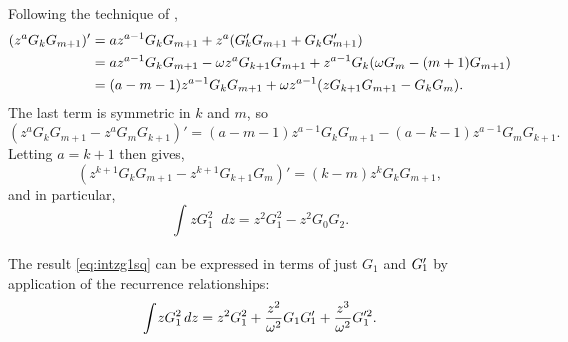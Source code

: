 \documentclass[parskip=half]{scrartcl}
\newcommand{\Int}[2]{\int_{#1}^{#2}\!}
\newcommand{\D}{\mathop{}\!d}
\theoremstyle{nonumberplain}
\begin{document}
Following the technique of \autocite[p.533]{lommel1879},
\begin{equation}
    \begin{aligned}
        (z^a G_k G_{m+1})'
        &= a z^{a-1} G_k G_{m+1} + z^a(\Gp_k G_{m+1} + G_k \Gp_{m+1})\\
        &= a z^{a-1} G_k G_{m+1} - \omega z^a G_{k+1}G_{m+1} + z^{a-1} G_k(\omega G_m - (m+1) G_{m+1})\\
        &= (a-m-1) z^{a-1} G_k G_{m+1} + \omega z^{a-1} (zG_{k+1}G_{m+1} - G_k G_m).
    \end{aligned}
\end{equation}
The last term is symmetric in $k$ and $m$, so
\begin{equation}
    (z^a G_k G_{m+1} - z^a G_m G_{k+1})' =
    (a-m-1) z^{a-1} G_k G_{m+1} - (a-k-1) z^{a-1} G_m G_{k+1}.
\end{equation}
Letting $a=k+1$ then gives,
\begin{equation}
    (z^{k+1} G_k G_{m+1} - z^{k+1} G_{k+1} G_m)' = (k-m) z^k G_k G_{m+1},
\end{equation}
and in particular,
\begin{equation}
    \label{eq:intzg1sq}
    \Int{}{} z G_1^2 \D z = z^2 G_1^2 - z^2 G_0 G_2.
\end{equation}

The result \eqref{eq:intzg1sq} can be expressed in terms of just $G_1$ and $\Gp_1$ by
application of the recurrence relationships:
\begin{equation}
    \label{eq:intzg1sqbis}
    \Int{}{} z G_1^2 \D z = z^2 G_1^2 + \frac{z^2}{\omega^2} G_1 \Gp_1 + \frac{z^3}{\omega^2} G^{\prime 2}_1.
\end{equation}


\printbibliography
\end{document}
